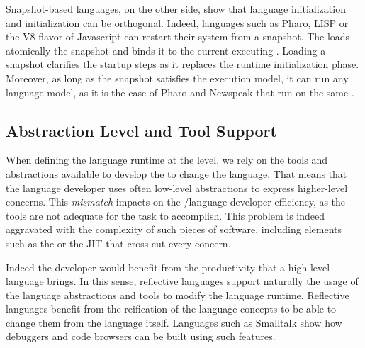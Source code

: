 Snapshot-based languages, on the other side, show that language initialization and \VM initialization can be orthogonal. Indeed, languages such as Pharo, LISP or the V8 flavor of Javascript can restart their system from a snapshot. The \VM loads atomically the snapshot and binds it to the current executing \VM. Loading a snapshot clarifies the \VM startup steps as it replaces the runtime initialization phase. Moreover, as long as the snapshot satisfies the \VM execution model, it can run any language model, as it is the case of Pharo and Newspeak that run on the same \VM.



\subsection*{Abstraction Level and Tool Support}

When defining the language runtime at the \VM level, we rely on the tools and abstractions available to develop the \VM to change the language. That means that the language developer uses often low-level abstractions to express higher-level concerns. This \emph{mismatch} impacts on the \VM/language developer efficiency, as the tools are not adequate for the task to accomplish. This problem is indeed aggravated with the complexity of such pieces of software, including elements such as the \GC or the JIT that cross-cut every \VM concern.

Indeed the developer would benefit from the productivity that a high-level language brings. In this sense, reflective languages support naturally the usage of the language abstractions and tools to modify the language runtime. Reflective languages benefit from the reification of the language concepts to be able to change them from the language itself. Languages such as Smalltalk show how debuggers and code browsers can be built using such features.

